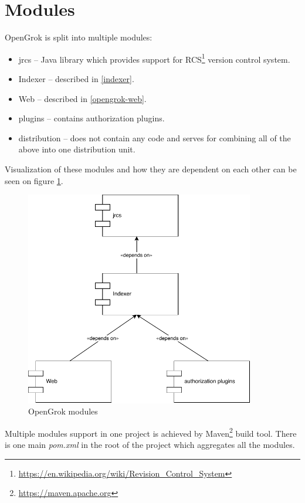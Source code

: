 \section{Modules}
\label{opengrok_modules}

OpenGrok is split into multiple modules:
\begin{itemize}
    \item jrcs – Java library which provides support for RCS\footnote{\url{https://en.wikipedia.org/wiki/Revision\_Control\_System}}
    version control system.
    \item Indexer – described in \ref{indexer}.
    \item Web – described in \ref{opengrok-web}.
    \item plugins – contains authorization plugins.
    \item distribution – does not contain any code and serves for combining all of the above into one distribution unit.
\end{itemize}

Visualization of these modules and how they are dependent on each other can be seen on figure \ref{opengrok_modules_img}.
\begin{figure}[htbp]
\centering
\includegraphics[width=100mm]{../img/opengrok_modules.pdf}
\caption{OpenGrok modules}
\label{opengrok_modules_img}
\end{figure}

Multiple modules support in one project is achieved by Maven\footnote{\url{https://maven.apache.org}} build tool.
There is one main \textit{pom.xml} in the root of the project which aggregates all the modules.

